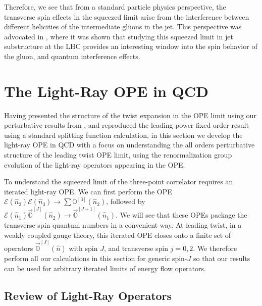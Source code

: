 \documentclass[letterpaper,11pt]{article}
\begin{document}
Therefore, we see that from a standard particle physics perspective, the transverse spin effects in the squeezed limit arise from the interference between different helicities of the intermediate gluons in the jet. This perspective was advocated in \cite{Chen:2020adz}, where it was shown that studying this squeezed limit in jet substructure at the LHC provides an interesting window into the spin behavior of the gluon, and quantum interference effects.


\section{The Light-Ray OPE in QCD}\label{sec:ope}

Having presented the structure of the twist expansion in the OPE limit using our perturbative results from \cite{Chen:2019bpb}, and reproduced the leading power fixed order result using a standard splitting function calculation, in this section we develop the light-ray OPE in QCD with a focus on understanding the all orders perturbative structure of the leading twist OPE limit, using the renormalization group evolution of the light-ray operators appearing in the OPE.

To understand the squeezed limit of the three-point correlator requires an iterated light-ray OPE. We can first perform the OPE $\mathcal{E}(\hat n_2) \mathcal{E}(\hat n_3) \to \sum \mathbb{O}^{[3]}(\hat n_2)$, followed by $\mathcal{E}(\hat n_1)  \vec{\mathbb{O}}^{[J]}(\hat n_2)  \to \vec{\mathbb{O}}^{[J+1]} (\hat n_1)$. We will see that these OPEs package the transverse spin quantum numbers in a convenient way. At leading twist, in a weakly coupled gauge theory, this iterated OPE closes onto a finite set of operators $\vec{\mathbb{O}}^{[J]}(\hat n)$ with spin $J$, and transverse spin $j=0,2$. We therefore perform all our calculations in this section for generic spin-$J$ so that our results can be used for arbitrary iterated limits of energy flow operators.



\subsection{Review of Light-Ray Operators}
\end{document}
